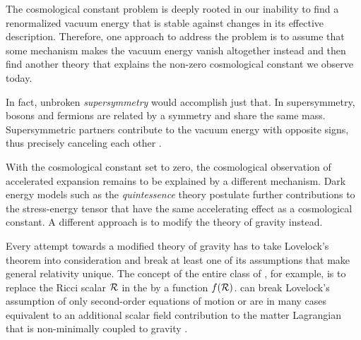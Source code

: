 The cosmological constant problem is deeply rooted in our inability to find a renormalized vacuum energy that is stable against changes in its effective description. Therefore, one approach to address the problem is to assume that some mechanism makes the vacuum energy vanish altogether instead and then find another theory that explains the non-zero cosmological constant we observe today.

In fact, unbroken \emph{supersymmetry} would accomplish just that. In supersymmetry, bosons and fermions are related by a symmetry and share the same mass. Supersymmetric partners contribute to the vacuum energy with opposite signs, thus precisely canceling each other \autocite{Martin1997}.

With the cosmological constant set to zero, the cosmological observation of accelerated expansion remains to be explained by a different mechanism. Dark energy models such as the \emph{quintessence} theory \autocite{Wetterich1988,Ratra1988} postulate further contributions to the stress-energy tensor that have the same accelerating effect as a cosmological constant. A different approach is to modify the theory of gravity instead.

Every attempt towards a modified theory of gravity has to take Lovelock's theorem into consideration and break at least one of its assumptions that make general relativity unique. The concept of the entire class of \emph{}, for example, is to replace the Ricci scalar \(\mathcal{R}\) in the  by a function \(f(\mathcal{R})\).
 can break Lovelock's assumption of only second-order equations of motion or are in many cases equivalent to an additional scalar field contribution to the matter Lagrangian that is non-minimally coupled to gravity \autocite{Clifton2012,Euclid2013}.

